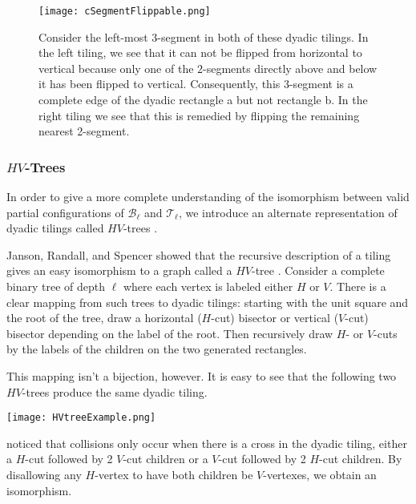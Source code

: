 \documentclass[11pt,letterpaper]{article}
\theoremstyle{definition}
\theoremstyle{remark}
\newcommand{\cB}{\mathcal B}
\newcommand{\cT}{\mathcal T}
\numberwithin{equation}{section}
\theoremstyle{definition}
\begin{document}
\begin{figure}[h]
\begin{center}
\texttt{[image: cSegmentFlippable.png]}
\end{center}
\caption{Consider the left-most 3-segment in both of these dyadic tilings. In the left tiling, we see that it can not be flipped from horizontal to vertical because only one of the $2$-segments directly above and below it has been flipped to vertical. Consequently, this 3-segment is a complete edge of the dyadic rectangle a but not rectangle b. In the right tiling we see that this is remedied by flipping the remaining nearest 2-segment.}
\label{fig:flipz}
\end{figure}

%

%

%

\subsubsection{$HV$-Trees}\label{sec:bitonicIsomorphism}

In order to give a more complete understanding of the isomorphism between valid partial configurations of $\cB_\ell$ and $\cT_\ell$, we introduce an alternate representation of dyadic tilings called $HV$-trees \cite{randomdyadictilingsoftheunitsquare}.

Janson, Randall, and Spencer showed that the recursive description of a tiling gives an easy isomorphism to a graph called a $HV$-tree \cite{randomdyadictilingsoftheunitsquare}. Consider a complete binary tree of depth $\ell$ where each vertex is labeled either $H$ or $V$. There is a clear mapping from such trees to dyadic tilings: starting with the unit square and the root of the tree, draw a horizontal ($H$-cut) bisector or vertical ($V$-cut) bisector depending on the label of the root. Then recursively draw $H$- or $V$-cuts by the labels of the children on the two generated rectangles.

This mapping isn't a bijection, however. It is easy to see that
the following two $HV$-trees produce the same dyadic tiling. 
\begin{center}
\texttt{[image: HVtreeExample.png]}
\end{center} \cite{randomdyadictilingsoftheunitsquare} noticed that collisions only occur when there is a cross in the dyadic tiling, either a $H$-cut followed by 2 $V$-cut children or a $V$-cut followed by 2 $H$-cut children. By disallowing any $H$-vertex to have both children be $V$-vertexes, we obtain an isomorphism.
\end{document}
